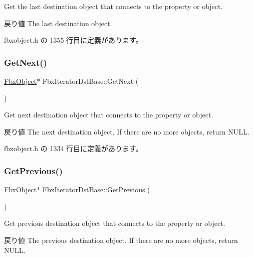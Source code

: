 Get the last destination object that connects to the property or object. \begin{DoxyReturn}{戻り値}
The last destination object. 
\end{DoxyReturn}


 fbxobject.\+h の 1355 行目に定義があります。

\mbox{\label{class_fbx_iterator_dst_base_ae7b2570f972d09f8e12b2dc22033c90e}} 
\subsubsection{\texorpdfstring{Get\+Next()}{GetNext()}}
{\footnotesize\ttfamily \hyperlink{class_fbx_object}{Fbx\+Object}$\ast$ Fbx\+Iterator\+Dst\+Base\+::\+Get\+Next (\begin{DoxyParamCaption}{ }\end{DoxyParamCaption})\hspace{0.3cm}{\ttfamily [inline]}}

Get next destination object that connects to the property or object. \begin{DoxyReturn}{戻り値}
The next destination object. If there are no more objects, return N\+U\+LL. 
\end{DoxyReturn}


 fbxobject.\+h の 1334 行目に定義があります。

\mbox{\label{class_fbx_iterator_dst_base_aa722d332048283c09ba3e690bfe52e14}} 
\subsubsection{\texorpdfstring{Get\+Previous()}{GetPrevious()}}
{\footnotesize\ttfamily \hyperlink{class_fbx_object}{Fbx\+Object}$\ast$ Fbx\+Iterator\+Dst\+Base\+::\+Get\+Previous (\begin{DoxyParamCaption}{ }\end{DoxyParamCaption})\hspace{0.3cm}{\ttfamily [inline]}}

Get previous destination object that connects to the property or object. \begin{DoxyReturn}{戻り値}
The previous destination object. If there are no more objects, return N\+U\+LL. 
\end{DoxyReturn}


